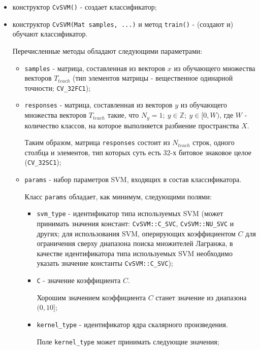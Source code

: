 \begin{itemize}

	\item конструктор \verb|CvSVM()| - создает классификатор;
	\item конструктор \verb|CvSVM(Mat samples, ...)| и метод \verb|train()| - (создают и) обучают классификатор.

	Перечисленные методы обладают следующими параметрами:

	\begin{itemize}

		\item \verb|samples| - матрица, составленная из векторов $x$ из обучающего множества векторов $T_{teach}$ (тип элементов матрицы - вещественное одинарной точности; \verb|CV_32FC1|);
		\item \verb|responses| - матрица, составленная из векторов $y$ из обучающего множества векторов $T_{teach}$ такие, что $N_y = 1 ;~ y \in \mathbb{Z} ;~ y \in [0, W)$, где $W$ - количество классов, на которое выполняется разбиение пространства $X$.

		Таким образом, матрица \verb|responses| состоит из $N_{teach}$ строк, одного столбца и элементов, тип которых суть есть 32-х битовое знаковое целое (\verb|CV_32SC1|);

		\item \verb|params| - набор параметров SVM, входящих в состав классификатора.

		Класс \verb|params| обладает, как минимум, следующими полями:

		\begin{itemize}

			\item \verb|svm_type| - идентификатор типа используемых SVM (может принимать значения констант: \linebreak \verb|CvSVM::C_SVC|, \verb|CvSVM::NU_SVC| и других; для использования SVM, оперирующих коэффициентом $C$ для ограничения сверху диапазона поиска множителей Лагранжа, в качестве идентификатора типа используемых SVM необходимо указать значение константы \verb|CvSVM::C_SVC|);
			\item \verb|C| - значение коэффициента $C$.

			Хорошим значением коэффициента $C$ станет значение из диапазона $(0, 10]$;

			\item \verb|kernel_type| - идентификатор ядра скалярного произведения.
			
			Поле \verb|kernel_type| может принимать следующие значения;
		

\end{itemize}
\end{itemize}
\end{itemize}
